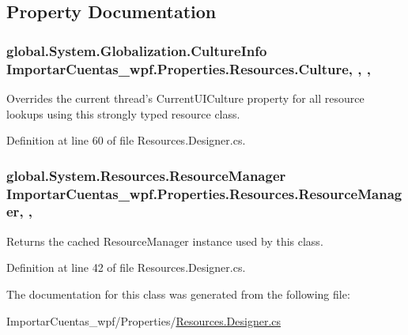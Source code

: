 \subsection{Property Documentation}
\hypertarget{class_importar_cuentas__wpf_1_1_properties_1_1_resources_a1f348c62caade2382f98b7a5977fc1f8}{
\subsubsection[{Culture}]{\setlength{\rightskip}{0pt plus 5cm}global.\-System.\-Globalization.\-Culture\-Info Importar\-Cuentas\-\_\-wpf.\-Properties.\-Resources.\-Culture\hspace{0.3cm}{\ttfamily [static]}, {\ttfamily [get]}, {\ttfamily [set]}, {\ttfamily [package]}}}\label{class_importar_cuentas__wpf_1_1_properties_1_1_resources_a1f348c62caade2382f98b7a5977fc1f8}


Overrides the current thread's Current\-U\-I\-Culture property for all resource lookups using this strongly typed resource class. 



Definition at line 60 of file Resources.\-Designer.\-cs.

\hypertarget{class_importar_cuentas__wpf_1_1_properties_1_1_resources_af2bc57c7d40375209d08b86c66f7e929}{
\subsubsection[{Resource\-Manager}]{\setlength{\rightskip}{0pt plus 5cm}global.\-System.\-Resources.\-Resource\-Manager Importar\-Cuentas\-\_\-wpf.\-Properties.\-Resources.\-Resource\-Manager\hspace{0.3cm}{\ttfamily [static]}, {\ttfamily [get]}, {\ttfamily [package]}}}\label{class_importar_cuentas__wpf_1_1_properties_1_1_resources_af2bc57c7d40375209d08b86c66f7e929}


Returns the cached Resource\-Manager instance used by this class. 



Definition at line 42 of file Resources.\-Designer.\-cs.



The documentation for this class was generated from the following file\-:\begin{DoxyCompactItemize}
\item 
Importar\-Cuentas\-\_\-wpf/\-Properties/\hyperlink{_importar_cuentas__wpf_2_properties_2_resources_8_designer_8cs}{Resources.\-Designer.\-cs}\end{DoxyCompactItemize}
